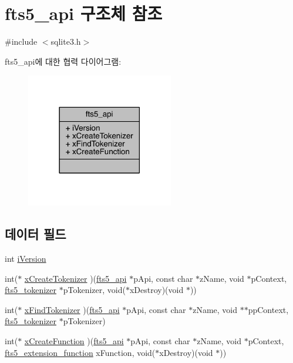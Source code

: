 \hypertarget{structfts5__api}{}\section{fts5\+\_\+api 구조체 참조}
\label{structfts5__api}


{\ttfamily \#include $<$sqlite3.\+h$>$}



fts5\+\_\+api에 대한 협력 다이어그램\+:
\nopagebreak
\begin{figure}[H]
\begin{center}
\leavevmode
\includegraphics[width=182pt]{d6/ddd/structfts5__api__coll__graph}
\end{center}
\end{figure}
\subsection*{데이터 필드}
\begin{DoxyCompactItemize}
\item 
int \hyperlink{structfts5__api_a3c338289abb33e1805da870172956a7c}{i\+Version}
\item 
int($\ast$ \hyperlink{structfts5__api_a7fe3663f85eab512d5c461e1674da129}{x\+Create\+Tokenizer} )(\hyperlink{structfts5__api}{fts5\+\_\+api} $\ast$p\+Api, const char $\ast$z\+Name, void $\ast$p\+Context, \hyperlink{structfts5__tokenizer}{fts5\+\_\+tokenizer} $\ast$p\+Tokenizer, void($\ast$x\+Destroy)(void $\ast$))
\item 
int($\ast$ \hyperlink{structfts5__api_a20a23794695fa61e2892ad1243b16b67}{x\+Find\+Tokenizer} )(\hyperlink{structfts5__api}{fts5\+\_\+api} $\ast$p\+Api, const char $\ast$z\+Name, void $\ast$$\ast$pp\+Context, \hyperlink{structfts5__tokenizer}{fts5\+\_\+tokenizer} $\ast$p\+Tokenizer)
\item 
int($\ast$ \hyperlink{structfts5__api_acf1a0612be3b91b908f38ecbc6735d17}{x\+Create\+Function} )(\hyperlink{structfts5__api}{fts5\+\_\+api} $\ast$p\+Api, const char $\ast$z\+Name, void $\ast$p\+Context, \hyperlink{sqlite3_8h_a8a1df7b5a066b194f490be5936e85c17}{fts5\+\_\+extension\+\_\+function} x\+Function, void($\ast$x\+Destroy)(void $\ast$))
\end{DoxyCompactItemize}


